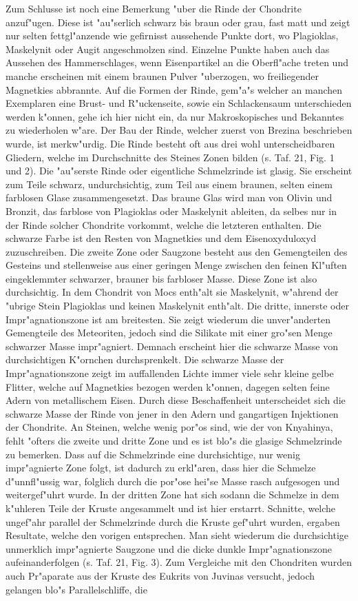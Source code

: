 \documentclass[a4paper, 11pt, oneside, polutonikogreek, german]{article}
\begin{document}
Zum Schlusse ist noch eine Bemerkung "uber die Rinde der Chondrite anzuf"ugen. Diese ist "au"serlich schwarz bis braun oder grau, fast matt und zeigt nur selten fettgl"anzende wie gefirnisst aussehende Punkte dort, wo Plagioklas, Maskelynit oder Augit angeschmolzen sind. Einzelne Punkte haben auch das Aussehen des Hammerschlages, wenn Eisenpartikel an die Oberfl"ache treten und manche erscheinen mit einem braunen Pulver "uberzogen, wo freiliegender Magnetkies abbrannte. Auf die Formen der Rinde, gem"a"s welcher an manchen Exemplaren eine Brust- und R"uckenseite, sowie ein Schlackensaum unterschieden werden k"onnen, gehe ich hier nicht ein, da nur Makroskopisches und Bekanntes zu wiederholen w"are. Der Bau der Rinde, welcher zuerst von Brezina beschrieben wurde, ist merkw"urdig. Die Rinde besteht oft aus drei wohl unterscheidbaren Gliedern, welche im Durchschnitte des Steines Zonen bilden (s. Taf. 21, Fig. 1 und 2). Die "au"serste Rinde oder eigentliche Schmelzrinde ist glasig. Sie erscheint zum Teile schwarz, undurchsichtig, zum Teil aus einem braunen, selten einem farblosen Glase zusammengesetzt. Das braune Glas wird man von Olivin und Bronzit, das farblose von Plagioklas oder Maskelynit ableiten, da selbes nur in der Rinde solcher Chondrite vorkommt, welche die letzteren enthalten. Die schwarze Farbe ist den Resten von Magnetkies und dem Eisenoxyduloxyd zuzuschreiben. Die zweite Zone oder Saugzone besteht aus den Gemengteilen des Gesteins und stellenweise aus einer geringen Menge zwischen den feinen Kl"uften eingeklemmter schwarzer, brauner bis farbloser Masse. Diese Zone ist also durchsichtig. In dem Chondrit von Mocs enth"alt sie Maskelynit, w"ahrend der "ubrige Stein Plagioklas und keinen Maskelynit enth"alt. Die dritte, innerste oder Impr"agnationszone ist am breitesten. Sie zeigt wiederum die unver"anderten Gemengteile des Meteoriten, jedoch sind die Silikate mit einer gro"sen Menge schwarzer Masse impr"agniert. Demnach erscheint hier die schwarze Masse von durchsichtigen K"ornchen durchsprenkelt. Die schwarze Masse der Impr"agnationszone zeigt im auffallenden Lichte immer viele sehr kleine gelbe Flitter, welche auf Magnetkies bezogen werden k"onnen, dagegen selten feine Adern von metallischem Eisen. Durch diese Beschaffenheit unterscheidet sich die schwarze Masse der Rinde von jener in den Adern und gangartigen Injektionen der Chondrite. An Steinen, welche wenig por"os sind, wie der von Knyahinya, fehlt "ofters die zweite und dritte Zone und es ist blo"s die glasige Schmelzrinde zu bemerken. Dass auf die Schmelzrinde eine durchsichtige, nur wenig impr"agnierte Zone folgt, ist dadurch zu erkl"aren, dass hier die Schmelze d"unnfl"ussig war, folglich durch die por"ose hei"se Masse rasch aufgesogen und weitergef"uhrt wurde. In der dritten Zone hat sich sodann die Schmelze in dem k"uhleren Teile der Kruste angesammelt und ist hier erstarrt. Schnitte, welche ungef"ahr parallel der Schmelzrinde durch die Kruste gef"uhrt wurden, ergaben Resultate, welche den vorigen entsprechen. Man sieht wiederum die durchsichtige unmerklich impr"agnierte Saugzone und die dicke dunkle Impr"agnationszone aufeinanderfolgen (s. Taf. 21, Fig. 3). Zum Vergleiche mit den Chondriten wurden auch Pr"aparate aus der Kruste des Eukrits von Juvinas versucht, jedoch gelangen blo"s Parallelschliffe, die 
\end{document}
